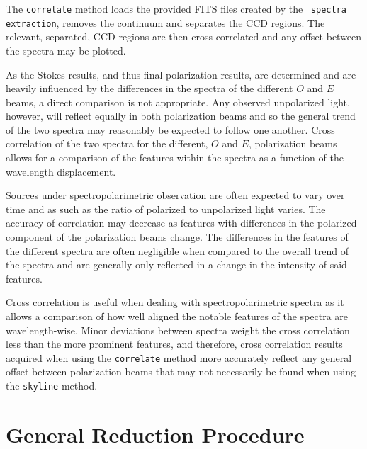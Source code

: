 The \texttt{correlate} method loads the provided \gls{FITS} files created by the \polsalt\ \texttt{spectra extraction}, removes the continuum and separates the \gls{CCD} regions. The relevant, separated, \gls{CCD} regions are then cross correlated and any offset between the spectra may be plotted.

As the Stokes results, and thus final polarization results, are determined and are heavily influenced by the differences in the spectra of the different $O$ and $E$ beams, a direct comparison is not appropriate. Any observed unpolarized light, however, will reflect equally in both polarization beams and so the general trend of the two spectra may reasonably be expected to follow one another. Cross correlation of the two spectra for the different, $O$ and $E$, polarization beams allows for a comparison of the features within the spectra as a function of the wavelength displacement.

Sources under spectropolarimetric observation are often expected to vary over time and as such as the ratio of polarized to unpolarized light varies. The accuracy of correlation may decrease as features with differences in the polarized component of the polarization beams change. The differences in the features of the different spectra are often negligible when compared to the overall trend of the spectra and are generally only reflected in a change in the intensity of said features.

Cross correlation is useful when dealing with spectropolarimetric spectra as it allows a comparison of how well aligned the notable features of the spectra are wavelength-wise. Minor deviations between spectra weight the cross correlation less than the more prominent features, and therefore, cross correlation results acquired when using the \texttt{correlate} method more accurately reflect any general offset between polarization beams that may not necessarily be found when using the \texttt{skyline} method.

\section{General Reduction Procedure}\label{sec:red_proc}

